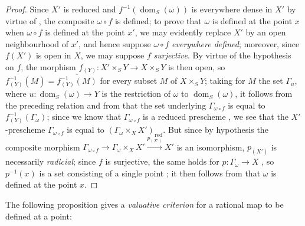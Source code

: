 \begin{proof}
Since $X'$ is reduced and $f^{-1}(\operatorname{dom}_S(\omega))$ is everywhere dense in $X'$ by virtue of , the composite $\omega\circ f$ is defined; to prove that $\omega$ is defined at the point $x$ when $\omega\circ f$ is defined at the point $x'$, we may evidently replace $X'$ by an open neighbourhood of $x'$, and hence suppose $\omega\circ f$ \emph{everywhere defined}; moreover, since $f(X')$ is open in $X$, we may suppose $f$ \emph{surjective}.
By virtue of the hypothesis on $f$, the morphism $f_{(Y)}:X'\times_S Y\to X\times_S Y$ is then open, so $f_{(Y)}^{-1}(\overline{M})=\overline{f_{(Y)}^{-1}(M)}$ for every subset $M$ of $X\times_S Y$; taking for $M$ the set $\Gamma_u$, where $u:\operatorname{dom}_S(\omega)\to Y$ is the restriction of $\omega$ to $\operatorname{dom}_S(\omega)$, it follows from the preceding relation and from  that the set underlying $\Gamma_{\omega\circ f}$ is equal to $f_{(Y)}^{-1}(\Gamma_\omega)$; since we know
that $\Gamma_{\omega\circ f}$ is a reduced prescheme , we see that the $X'$-prescheme $\Gamma_{\omega\circ f}$ is equal to $(\Gamma_\omega\times_X X')_\mathrm{red}$.
But since by hypothesis the composite morphism $\Gamma_{\omega\circ f}\to\Gamma_\omega\times_X X'\xrightarrow{p_{(X')}}X'$ is an isomorphism, $p_{(X')}$ is necessarily \emph{radicial}; since $f$ is surjective, the same holds for $p:\Gamma_\omega\to X$ , so $p^{-1}(x)$ is a set consisting of a single point ; it then follows from  that $\omega$ is defined at the point $x$.
\end{proof}

The following proposition gives a \emph{valuative criterion} for a rational map to be defined at a point:

